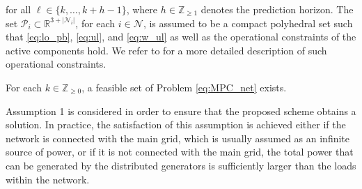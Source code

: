 for all $\ell \in \{k,\dots,k+h-1\}$, where $h \in \mathbb{Z}_{\geq 1}$ denotes the prediction horizon. The set $\mathcal{P}_i\subset \mathbb{R}^{3+|\mathcal{N}_i|}$, for each $i\in\mathcal{N}$, is assumed to be a compact polyhedral set such that \eqref{eq:lo_pb}, \eqref{eq:ul}, and \eqref{eq:w_ul} as well as the operational constraints of the active components hold. We refer to \cite{ananduta2019a} for a more detailed description of such operational constraints. %

\color{black}
\begin{assum}\label{as:feas_ED_cent}
	For each $k \in \mathbb{Z}_{\geq 0}$, a feasible set of Problem \eqref{eq:MPC_net} exists. %
\end{assum}


\begin{rem} 	Assumption 1 is considered in order to ensure that the proposed scheme obtains a solution. In practice, the satisfaction of this assumption is achieved either if the network is connected with the main grid, which is usually assumed as an infinite source of power, or if it is not connected with the main grid, the total power that can be generated by the distributed generators is sufficiently larger than the loads within the network.
\end{rem}




